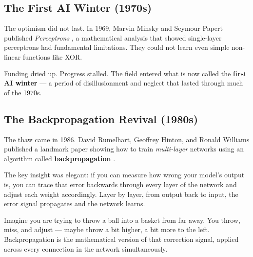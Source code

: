 \subsection{The First AI Winter (1970s)}

The optimism did not last.
In 1969, Marvin Minsky and Seymour Papert published \emph{Perceptrons} \cite{minsky1969perceptrons}, a mathematical analysis that showed single-layer perceptrons had fundamental limitations.
They could not learn even simple non-linear functions like XOR.

Funding dried up.
Progress stalled.
The field entered what is now called the \textbf{first AI winter} --- a period of disillusionment and neglect that lasted through much of the 1970s.

\subsection{The Backpropagation Revival (1980s)}

The thaw came in 1986.
David Rumelhart, Geoffrey Hinton, and Ronald Williams published a landmark paper showing how to train \emph{multi-layer} networks using an algorithm called \textbf{backpropagation} \cite{rumelhart1986learning}.

The key insight was elegant: if you can measure how wrong your model's output is, you can trace that error backwards through every layer of the network and adjust each weight accordingly.
Layer by layer, from output back to input, the error signal propagates and the network learns.

\begin{tcolorbox}[colback=green!5!white, colframe=green!40!black, title=Backpropagation in Plain English]
Imagine you are trying to throw a ball into a basket from far away.
You throw, miss, and adjust --- maybe throw a bit higher, a bit more to the left.
Backpropagation is the mathematical version of that correction signal, applied across every connection in the network simultaneously.
\end{tcolorbox}

